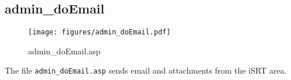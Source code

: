 \subsection{admin\_doEmail}
\begin{figure}[htb]
    \begin{center}
        \texttt{[image: figures/admin\_doEmail.pdf]}
    \end{center}
    \caption{admin\_doEmail.asp}
    \label{fig:admin_doEmail}
\end{figure}

The file \verb|admin_doEmail.asp| sends email and attachments from the iSRT
area.
